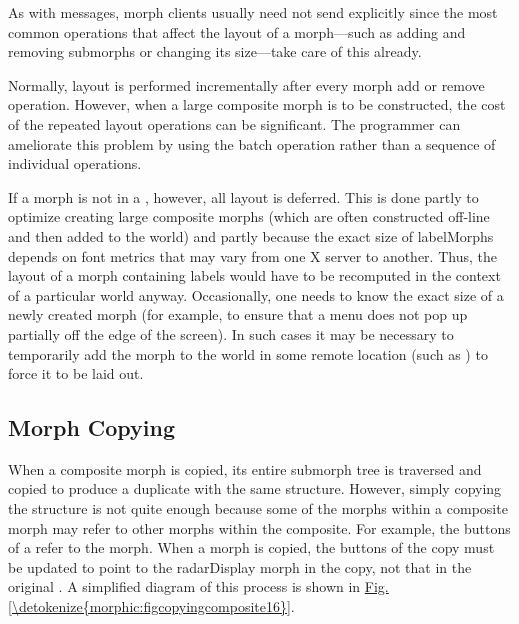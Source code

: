 \documentclass[letterpaper,10pt,english]{sphinxmanual}
\begin{document}
As with  messages, morph clients usually need not send  explicitly since the most common operations that affect the layout of a morph—such as adding and removing submorphs or changing its size—take care of this already.

Normally, layout is performed incrementally after every morph add or remove operation. However, when a large composite morph is to be constructed, the cost of the repeated layout operations can be significant. The programmer can ameliorate this problem by using the batch operation  rather than a sequence of individual  operations.

If a morph is not in a , however, all layout is deferred. This is done partly to optimize creating large composite morphs (which are often constructed \sphinxquotedblleft{}off-line\sphinxquotedblright{} and then added to the world) and partly because the exact size of labelMorphs depends on font metrics that may vary from one X server to another. Thus, the layout of a morph containing labels would have to be recomputed in the context of a particular world anyway. Occasionally, one needs to know the exact size of a newly created morph (for example, to ensure that a menu does not pop up partially off the edge of the screen). In such cases it may be necessary to temporarily add the morph to the world in some remote location (such as ) to force it to be laid out.


\subsection{Morph Copying}
\label{\detokenize{morphic:morph-copying}}
When a composite morph is copied, its entire submorph tree is traversed and copied to produce a duplicate with the same structure. However, simply copying the structure is not quite enough because some of the morphs within a composite morph may refer to other morphs within the composite. For example, the buttons of a  refer to the  morph. When a  morph is copied, the buttons of the copy must be updated to point to the radarDisplay morph in the copy, not that in the original . A simplified diagram of this process is shown in \hyperref[\detokenize{morphic:figcopyingcomposite16}]{Fig.\@ \ref{\detokenize{morphic:figcopyingcomposite16}}}.
\end{document}
